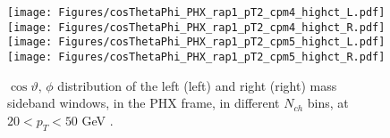 \documentclass[12pt]{article}
\newcommand{\pt}{$p_{\mathrm{T}}$}
\begin{document}
\begin{figure}[htbp]
\centering
\texttt{[image: Figures/cosThetaPhi\_PHX\_rap1\_pT2\_cpm4\_highct\_L.pdf]}
\texttt{[image: Figures/cosThetaPhi\_PHX\_rap1\_pT2\_cpm4\_highct\_R.pdf]}
\texttt{[image: Figures/cosThetaPhi\_PHX\_rap1\_pT2\_cpm5\_highct\_L.pdf]}
\texttt{[image: Figures/cosThetaPhi\_PHX\_rap1\_pT2\_cpm5\_highct\_R.pdf]}
\caption{$\cos\vartheta,\,\phi$ distribution of the left (left) and
  right (right) mass sideband windows, in the PHX frame, in different
  $N_{ch}$ bins, at $20 < p_{T} < 50$ GeV .}
\end{figure}
\clearpage

%
\end{document}
